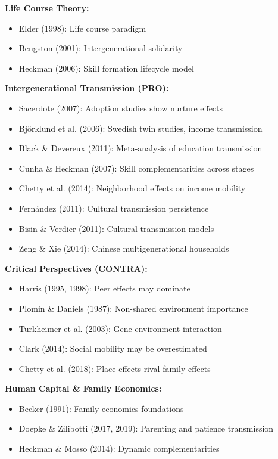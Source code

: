 \textbf{Life Course Theory:}
\begin{itemize}[nosep]
    \item Elder (1998): Life course paradigm
    \item Bengston (2001): Intergenerational solidarity
    \item Heckman (2006): Skill formation lifecycle model
\end{itemize}

\textbf{Intergenerational Transmission (PRO):}
\begin{itemize}[nosep]
    \item Sacerdote (2007): Adoption studies show nurture effects
    \item Björklund et al. (2006): Swedish twin studies, income transmission
    \item Black \& Devereux (2011): Meta-analysis of education transmission
    \item Cunha \& Heckman (2007): Skill complementarities across stages
    \item Chetty et al. (2014): Neighborhood effects on income mobility
    \item Fernández (2011): Cultural transmission persistence
    \item Bisin \& Verdier (2011): Cultural transmission models
    \item Zeng \& Xie (2014): Chinese multigenerational households
\end{itemize}

\textbf{Critical Perspectives (CONTRA):}
\begin{itemize}[nosep]
    \item Harris (1995, 1998): Peer effects may dominate
    \item Plomin \& Daniels (1987): Non-shared environment importance
    \item Turkheimer et al. (2003): Gene-environment interaction
    \item Clark (2014): Social mobility may be overestimated
    \item Chetty et al. (2018): Place effects rival family effects
\end{itemize}

\textbf{Human Capital \& Family Economics:}
\begin{itemize}[nosep]
    \item Becker (1991): Family economics foundations
    \item Doepke \& Zilibotti (2017, 2019): Parenting and patience transmission
    \item Heckman \& Mosso (2014): Dynamic complementarities
\end{itemize}

